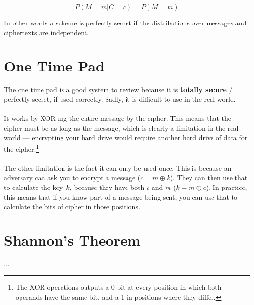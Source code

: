 $$P(M=m|C=c)=P(M=m)$$

In other words a scheme is perfectly secret if the distributions over messages and ciphertexts are independent.

\section{One Time Pad}
The one time pad is a good system to review because it is \textbf{totally secure} / perfectly secret, if used correctly. Sadly, it is difficult to use in the real-world.\\
\\
It works by XOR-ing the entire message by the cipher. This means that the cipher must be as long as the message, which is clearly a limitation in the real world --- encrypting your hard drive would require another hard drive of data for the cipher.\footnote{The XOR operations outputs a 0 bit at every position in which both operands have the same bit, and a 1 in positions where they differ.}\\
\\
The other limitation is the fact it can only be used once. This is because an adversary  can ask you to encrypt a message ($c=m\oplus k$). They can then use that to calculate the key, $k$,  because they have both $c$ and $m$ ($k=m\oplus c$). In practice, this means that if you know part of a message being sent, you can use that to calculate the bits of cipher in those positions.

\section{Shannon's Theorem}
...